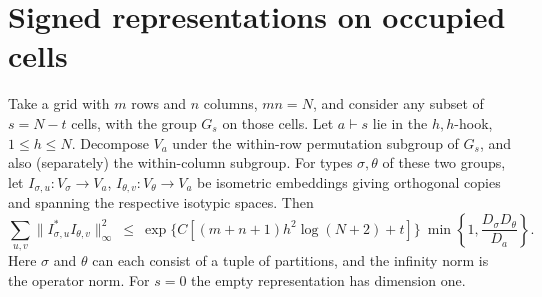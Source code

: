 \section{Signed representations on occupied cells}
\label{ten:weighted:part:96}
\begin{theorem}\label{thm:occupied}
Take a grid with \(m\) rows and \(n\) columns, \(mn=N\), and consider any subset of \(s=N-t\) cells, with the group \(G_s\) on those cells. Let \(a\vdash s\) lie in the \(h,h\)-hook, \(1\le h\le N\). Decompose \(V_a\) under the within-row permutation subgroup of \(G_s\), and also (separately) the within-column subgroup. For types \(\sigma,\theta\) of these two groups, let \(I_{\sigma,u}: V_\sigma\to V_a\), \(I_{\theta,v}: V_\theta\to V_a\) be isometric embeddings giving orthogonal copies and spanning the respective isotypic spaces. Then
\begin{equation}
 \sum_{u,v}\|I_{\sigma,u}^* I_{\theta,v}\|_\infty^2
 \ \le\
 \exp\{C[(m+n+1)h^2\log(N+2)+t]\}\ \min\left\{1,\frac{D_\sigma D_\theta}{D_a}\right\}.       \label{ten:weighted:eq:7}
\end{equation}
Here \(\sigma\) and \(\theta\) can each consist of a tuple of partitions, and the infinity norm is the operator norm. For \(s=0\) the empty representation has dimension one.
\end{theorem}
